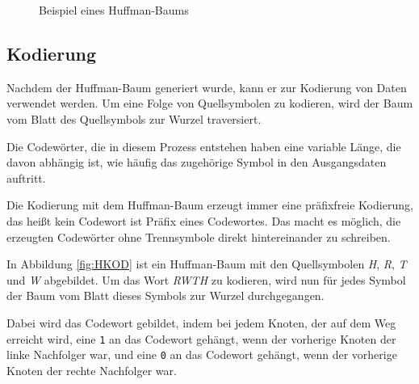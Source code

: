 \documentclass[twoside,11pt,a4paper]{article}
\theoremstyle{break}
\begin{document}
\begin{figure}[h]
\centering
{}
\caption{Beispiel eines Huffman-Baums} \label{fig:HBEX}
\end{figure}


\subsection{Kodierung}

Nachdem der Huffman-Baum generiert wurde, kann er zur Kodierung von
Daten verwendet werden. Um eine Folge von Quellsymbolen zu kodieren,
wird der Baum vom Blatt des Quellsymbols zur Wurzel traversiert.

Die Codewörter, die in diesem Prozess entstehen haben eine variable
Länge, die davon abhängig ist, wie häufig das zugehörige Symbol in den
Ausgangsdaten auftritt.

Die Kodierung mit dem Huffman-Baum erzeugt immer eine präfixfreie
Kodierung, das heißt kein Codewort ist Präfix eines Codewortes. Das
macht es möglich, die erzeugten Codewörter ohne Trennsymbole direkt
hintereinander zu schreiben.

In Abbildung \ref{fig:HKOD} ist ein Huffman-Baum mit den Quellsymbolen
\emph{H}, \emph{R}, \emph{T} und \emph{W} abgebildet. Um das Wort
\emph{RWTH} zu kodieren, wird nun für jedes Symbol der Baum vom Blatt
dieses Symbols zur Wurzel durchgegangen.

Dabei wird das Codewort gebildet, indem bei jedem Knoten, der auf dem
Weg erreicht wird, eine {\tt1} an das Codewort gehängt, wenn der
vorherige Knoten der linke Nachfolger war, und eine {\tt0} an das
Codewort gehängt, wenn der vorherige Knoten der rechte Nachfolger war.
\end{document}
